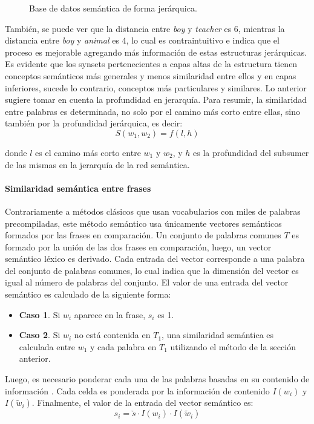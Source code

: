\begin{figure}
	\def\svgwidth{\linewidth}
	
	\caption{Base de datos semántica de forma jerárquica.}
\end{figure}

\bigskip También, se puede ver que la distancia entre \textit{boy} y \textit{teacher} es 6, mientras la distancia entre \textit{boy} y \textit{animal} es 4, lo cual es contraintuitivo e indica que el proceso es mejorable agregando más información de estas estructuras jerárquicas. Es evidente que los synsets pertenecientes a capas altas de la estructura tienen conceptos semánticos más generales y menos similaridad entre ellos y en capas inferiores, sucede lo contrario, conceptos más particulares y similares. Lo anterior sugiere tomar en cuenta la profundidad en jerarquía. Para resumir, la similaridad entre palabras es determinada, no solo por el camino más corto entre ellas, sino también por la profundidad jerárquica, es decir:
\[S(w_1,w_2)=f(l,h)\]

donde \(l\) es el camino más corto entre \(w_1\) y \(w_2\), y \(h\) es la profundidad del subsumer de las mismas en la jerarquía de la red semántica.

\paragraph{Similaridad semántica entre frases}
Contrariamente a métodos clásicos que usan vocabularios con miles de palabras precompiladas, este método semántico usa únicamente vectores semánticos formados por las frases en comparación. Un conjunto de palabras comunes \(T\) es formado por la unión de las dos frases en comparación, luego, un vector semántico léxico es derivado. Cada entrada del vector corresponde a una palabra del conjunto de palabras comunes, lo cual indica que la dimensión del vector es igual al número de palabras del conjunto. El valor de una entrada del vector semántico es calculado de la siguiente forma:
\begin{itemize}
	\item \textbf{Caso 1}.  Si \(w_i\) aparece en la frase, \(s_i\) es 1.
	\item \textbf{Caso 2}. Si \(w_i\)  no está contenida en \(T_1\), una similaridad semántica es calculada entre \(w_1\) y cada palabra en \(T_1\) utilizando el método de la sección anterior.
\end{itemize}

Luego, es necesario ponderar cada una de las palabras basadas en su contenido de información \citep{ribadas2005semantic}. Cada celda es ponderada por la información de contenido \(I(w_i)\) y \(I(\widetilde{w}_i)\). Finalmente, el valor de la entrada del vector semántico es:
\[s_i = \check{s} \cdot I(w_i) \cdot I(\widetilde{w}_i)\]

